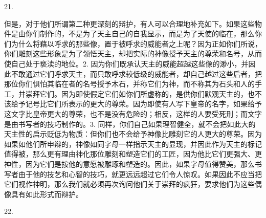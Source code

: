 21. \par

但是，对于他们所谓第二种更深刻的辩护，有人可以合理地补充如下。如果这些物件是由你们制作的，不是为了天主自己的自我显示，而是为了天使的临在，那么你们为什么将藉以呼求的那些像，置于被呼求的威能者之上呢？因为正如你们所说，你们雕刻这些形象是为了领悟天主，却把实际的神像授予天主的尊荣和名号，从而使自己处于亵渎的地位。2. 因为你们既承认天主的威能超越这些像的渺小，并因此不敢通过它们呼求天主，而只敢呼求较低级的威能者，却自己越过这些后者，把那位你们惧怕其临在者的名号授予木石，并称它们为神，而不称其为石头和人的手工，并崇拜它们。因为即使假定它们如你们所虚称的，是供你们默观天主的，也不该给予记号比它们所表示的更大的尊荣。因为即使有人写下皇帝的名字，如果给予这文字比皇帝更大的尊荣，也不是没有危险的；相反，这样的人要受死刑；而文字是由书写者的技巧制作的。3. 同样，你们自己如果理智健全，就不会把如此大的天主性的启示贬低为物质：但你们也不会给予神像比雕刻它的人更大的尊荣。因为如果如他们所申辩的，神像如同字母一样指示天主的显现，并因此作为天主的标记值得被，那么更有理由神化那位雕刻和塑造它们的工匠，因为他比它们更强大、更神性，因为它们是按他的意愿被雕琢和塑造的。因此，如果字母值得赞美，那么书写者由于他的技艺和心智的技巧，就更远远超过它们令人惊叹。如果因此不应当把它们视作神明，那么我们就必须再次询问他们关于崇拜的疯狂，要求他们为这些偶像具有如此形式而辩护。\par

22. \par

